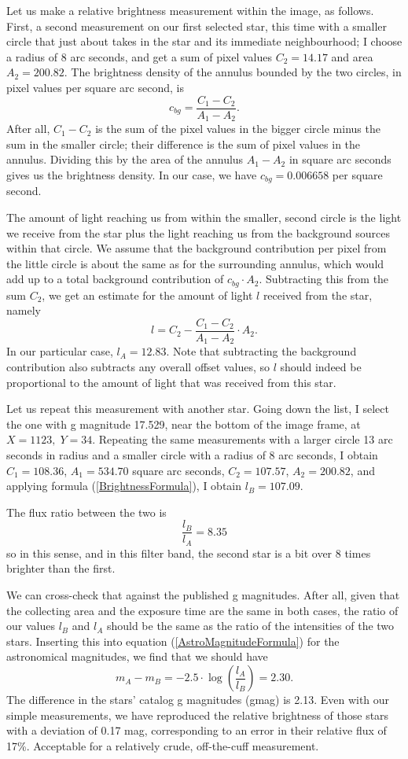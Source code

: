 \documentclass[twocolumn,apj]{openjournal}
\newcommand{\be}{\begin{equation}}
\newcommand{\ee}{\end{equation}}
\begin{document}
Let us make a relative brightness measurement within the image, as follows. First, a second measurement on our first selected star, this time with a smaller circle that just about takes in the star and its immediate neighbourhood; I choose a radius of 8 arc seconds, and get a sum of pixel values $C_2=14.17$ and area $A_2=200.82$. The brightness density of the annulus bounded by the two circles, in pixel values per square arc second, is
\be
c_{bg} = \frac{C_1-C_2}{A_1-A_2}. 
\ee
After all, $C_1-C_2$ is the sum of the pixel values in the bigger circle minus the sum in the smaller circle; their difference is the sum of pixel values in the annulus. Dividing this by the area of the annulus $A_1-A_2$ in square arc seconds gives us the brightness density. In our case, we have $c_{bg}=0.006658$ per square second.

The amount of light reaching us from within the smaller, second circle is the light we receive from the star plus the light reaching us from the background sources within that circle. We assume that the background contribution per pixel from the little circle is about the same as for the surrounding annulus, which would add up to a total background contribution of  $c_{bg}\cdot A_2$. Subtracting this from the sum $C_2$, we get an estimate for the amount of light $l$ received from the star, namely
\be
l = C_2 - \frac{C_1-C_2}{A_1-A_2}\cdot A_2.
\label{BrightnessFormula}
\ee
In our particular case, $l_A=12.83$. Note that subtracting the background contribution also subtracts any overall offset values, so $l$ should indeed be proportional to the amount of light that was received from this star.

Let us repeat this measurement with another star. Going down the list, I select the one with g magnitude 17.529, near the bottom of the image frame, at $X=1123,\;Y=34$. Repeating the same measurements with a larger circle 13 arc seconds in radius and a smaller circle with a radius of 8 arc seconds, I obtain $C_1=108.36$, $A_1=534.70$ square arc seconds, $C_2=107.57$, $A_2=200.82$, and applying formula (\ref{BrightnessFormula}), I obtain $l_B=107.09$.

The flux ratio between the two is
\be
\frac{l_B}{l_A} = 8.35
\ee
so in this sense, and in this filter band, the second star is a bit over 8 times brighter than the first.

We can cross-check that against the published g magnitudes. After all, given that the collecting area and the exposure time are the same in both cases, the ratio of our values $l_B$ and $l_A$ should be the same as the ratio of the intensities of the two stars. Inserting this into equation (\ref{AstroMagnitudeFormula}) for the astronomical magnitudes, we find that we should have
\be
m_A-m_B = -2.5\cdot\log\left(\frac{l_A}{l_B}\right) = 2.30.
\ee
The difference in the stars' catalog g magnitudes (gmag) is 2.13. Even with our simple measurements, we have reproduced the relative brightness of those stars with a deviation of 0.17 mag, corresponding to an error in their relative flux of 17\%. Acceptable for a relatively crude, off-the-cuff measurement.
\end{document}
